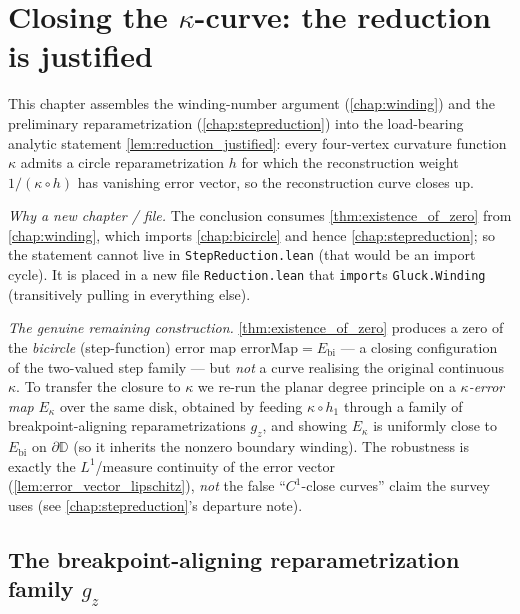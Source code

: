 \chapter{Closing the \texorpdfstring{$\kappa$}{kappa}-curve: the reduction is justified}
\label{chap:reduction}


This chapter assembles the winding-number argument (\cref{chap:winding}) and the
preliminary reparametrization (\cref{chap:stepreduction}) into the load-bearing
analytic statement \cref{lem:reduction_justified}: every four-vertex curvature
function $\kappa$ admits a circle reparametrization $h$ for which the
reconstruction weight $1/(\kappa\circ h)$ has vanishing error vector, so the
reconstruction curve closes up.

\medskip

\noindent\emph{Why a new chapter / file.} The conclusion consumes
\cref{thm:existence_of_zero} from \cref{chap:winding}, which imports
\cref{chap:bicircle} and hence \cref{chap:stepreduction}; so the statement cannot
live in \texttt{StepReduction.lean} (that would be an import cycle). It is placed
in a new file \texttt{Reduction.lean} that \texttt{import}s
\texttt{Gluck.Winding} (transitively pulling in everything else).

\medskip

\noindent\emph{The genuine remaining construction.} \cref{thm:existence_of_zero}
produces a zero of the \emph{bicircle} (step-function) error map
$\mathrm{errorMap} = E_{\mathrm{bi}}$ --- a closing configuration of the
two-valued step family --- but \emph{not} a curve realising the original
continuous $\kappa$. To transfer the closure to $\kappa$ we re-run the planar
degree principle on a \emph{$\kappa$-error map} $E_\kappa$ over the same disk,
obtained by feeding $\kappa\circ h_1$ through a family of breakpoint-aligning
reparametrizations $g_z$, and showing $E_\kappa$ is uniformly close to
$E_{\mathrm{bi}}$ on $\partial\mathbb{D}$ (so it inherits the nonzero boundary
winding). The robustness is exactly the $L^1$/measure continuity of the error
vector (\cref{lem:error_vector_lipschitz}), \emph{not} the false ``$C^1$-close
curves'' claim the survey uses (see \cref{chap:stepreduction}'s departure note).

\section{The breakpoint-aligning reparametrization family \texorpdfstring{$g_z$}{g\_z}}

